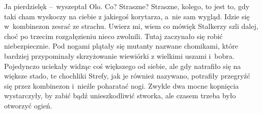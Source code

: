 \documentclass[../MAIN.tex]{subfiles}
\begin{document}
\xx Ja pierdzielę\3k --~wyszeptał Olo.
\xx Co? Straszne? Straszne, kolego, to jest to, gdy taki cham wyskoczy na ciebie z jakiegoś korytarza, a~nie sam wygląd. Idzie się w~kombinezon zesrać ze strachu. Uwierz mi, wiem co mówię\3k
\qd
\hspace{14.5em}Stalkerzy szli dalej, choć po trzecim rozgałęzieniu nieco zwolnili. Tutaj zaczynało się robić niebezpiecznie. Pod nogami plątały się mutanty nazwane chomikami, które bardziej przypominały skrzyżowanie wiewiórki z wielkimi uszami i~bobra. Pojedynczo uciekały widząc coś większego od siebie, ale gdy natrafiło się na większe stado, te chochliki Strefy, jak je również nazywano, potrafiły przegryźć się przez kombinezon i~nieźle poharatać nogi. Zwykle dwa mocne kopnięcia wystarczyły, by zabić bądź unieszkodliwić stworka, ale czasem trzeba było otworzyć ogień.
\end{document}
